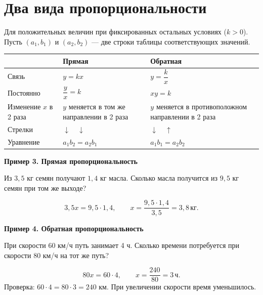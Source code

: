 \documentclass[a4paper,12pt]{article}
\newcommand{\ex}[1]{\par\smallskip\textcolor{darkaccent}{\textbf{#1}}\par}
\newcommand{\kg}{\,\text{кг}}
\newcommand{\hours}{\,\text{ч}}
\begin{document}
\section{Два вида пропорциональности}
Для положительных величин при фиксированных остальных условиях ($k>0$). Пусть $(a_1,b_1)$ и $(a_2,b_2)$ — две строки таблицы соответствующих значений.
\begin{center}
\begin{tabularx}{\linewidth}{@{}lXX@{}}
\toprule & Прямая & Обратная\\\midrule
Связь & $y=kx$ & $y=\dfrac{k}{x}$\\
Постоянно & $\dfrac yx=k$ & $xy=k$\\
Изменение $x$ в 2 раза & $y$ меняется в том же направлении в 2 раза & $y$ меняется в противоположном направлении в 2 раза\\
Стрелки & $\downarrow\quad\downarrow$ & $\downarrow\quad\uparrow$\\
Уравнение & $a_1b_2=a_2b_1$ & $a_1b_1=a_2b_2$\\\bottomrule
\end{tabularx}
\end{center}
\ex{Пример 3. Прямая пропорциональность}
Из $3{,}5$ кг семян получают $1{,}4$ кг масла. Сколько масла получится из $9{,}5$ кг семян при том же выходе?
\begin{center}
\end{center}
\[3{,}5x=9{,}5\cdot1{,}4,\qquad x=\frac{9{,}5\cdot1{,}4}{3{,}5}=3{,}8\kg.\]
\ex{Пример 4. Обратная пропорциональность}
При скорости 60 км/ч путь занимает 4 ч. Сколько времени потребуется при скорости 80 км/ч на тот же путь?
\begin{center}
\end{center}
\[80x=60\cdot4,\qquad x=\frac{240}{80}=3\hours.\]
Проверка: $60\cdot4=80\cdot3=240$ км. При увеличении скорости время уменьшилось.
\clearpage
\end{document}
